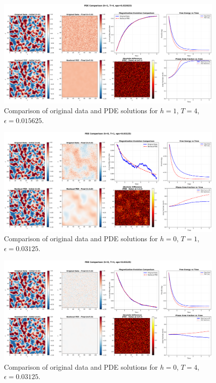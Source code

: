 \documentclass[11pt,a4paper]{article}
\begin{document}
\begin{figure}[!h]
    \centering
    \includegraphics[width=1.0\textwidth]{fig/pde_comparison_h1_T4_eps0.015625.png}
    \caption{Comparison of original data and PDE solutions for $h=1$, $T=4$, $\epsilon=0.015625$.}
\end{figure}


\begin{figure}[!h]
    \centering
    \includegraphics[width=1.0\textwidth]{fig/pde_comparison_h0_T1_eps0.03125.png}
    \caption{Comparison of original data and PDE solutions for $h=0$, $T=1$, $\epsilon=0.03125$.}
\end{figure}


\begin{figure}[h]
    \centering
    \includegraphics[width=1.0\textwidth]{fig/pde_comparison_h0_T4_eps0.03125.png}
    \caption{Comparison of original data and PDE solutions for $h=0$, $T=4$, $\epsilon=0.03125$.}
\end{figure}
\end{document}
